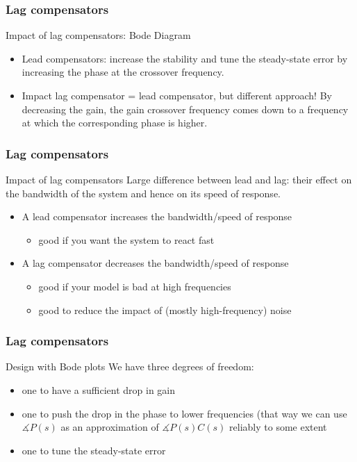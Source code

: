\begin{frame}
	\frametitle{Lag compensators}
	\begin{block}{Impact of lag compensators: Bode Diagram}
	\begin{itemize}
		\item Lead compensators: increase the stability and tune the steady-state error by increasing the phase at the crossover frequency.
		\item Impact lag compensator = lead compensator, but different approach!
		By decreasing the gain, the gain crossover frequency comes down to a frequency at which the corresponding phase is higher.
		
	\end{itemize}
	\end{block}
\end{frame}

\begin{frame}
	\frametitle{Lag compensators}
	\begin{block}{Impact of lag compensators}
		Large difference between lead and lag: their effect on the bandwidth of the system and hence on its speed of response.
		\begin{itemize}
			\item A lead compensator increases the bandwidth/speed of response 
			\begin{itemize} 
			\item good if you want the system to react fast
			\end{itemize}
			\item A lag compensator decreases the bandwidth/speed of response 
			\begin{itemize}
			\item good if your model is bad at high frequencies
			\item good to reduce the impact of (mostly high-frequency) noise 
			\end{itemize}
		\end{itemize}
	\end{block}
\end{frame}

\begin{frame}
\frametitle{Lag compensators}
\begin{block}{Design with Bode plots}
We have three degrees of freedom:
\begin{itemize}
	\item one to have a sufficient drop in gain
	\item one to push the drop in the phase to lower frequencies (that way we can use $\measuredangle P(s)$ as an approximation of $\measuredangle P(s)C(s)$ reliably to some extent
	\item one to tune the steady-state error
\end{itemize}
		
\end{block}
\end{frame}

